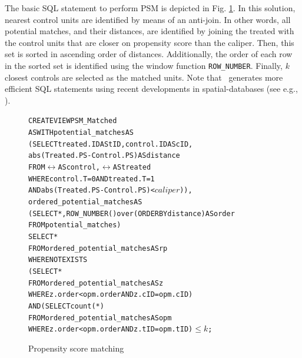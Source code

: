 The basic SQL statement to perform PSM is depicted in Fig. \ref{fig:nnmnr}. In this solution, nearest control units are identified by means of an anti-join. In other words, all potential matches, and their distances, are identified by joining the treated with the control units that are closer on propensity score than the caliper. Then, this set is sorted in ascending order of distances. Additionally, the order of each row in the sorted set is identified using the window function {\verb|ROW_NUMBER|}. Finally, $k$ closest controls are selected as the matched units. Note that \GSQL\  generates more efficient SQL statements using recent developments in spatial-databases (see e.g., \cite{obe2015postgis}).


\begin{figure}
  \centering
\begin{alltt} \scriptsize
CREATE VIEW PSM_Matched
AS WITH potential_matches AS
  (SELECT treated.ID AS tID, control.ID AS cID,
          abs(Treated.PS-Control.PS)  AS distance
   FROM \(\rel\) AS control, \(\rel\) AS treated
   WHERE control.T=0 AND treated.T=1
     AND abs(Treated.PS-Control.PS) < \(caliper\))),
            ordered_potential_matches AS
  (SELECT *, ROW_NUMBER() over (ORDER BY distance) AS order
   FROM potential_matches)
SELECT *
FROM ordered_potential_matches AS rp
WHERE NOT EXISTS
    (SELECT *
     FROM ordered_potential_matches AS z
     WHERE z.order < opm.order AND z.cID=opm.cID)
  AND (SELECT count(*)
     FROM ordered_potential_matches AS opm
     WHERE z.order < opm.order AND z.tID=opm.tID)\( \leq k\);
\end{alltt} \vspace{-.3cm}
  \caption{ Propensity score matching}\label{fig:nnmnr}
\end{figure}



